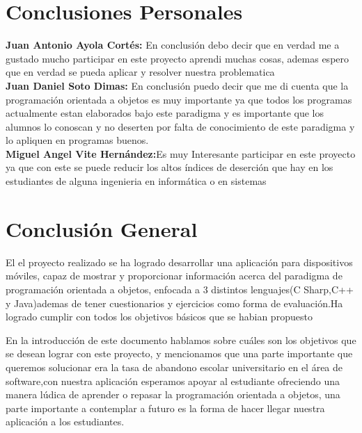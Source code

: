 \section{Conclusiones Personales}
\textbf{Juan Antonio Ayola Cortés: }En conclusión debo decir que en verdad me a gustado mucho participar en este proyecto aprendi muchas cosas, ademas espero que en verdad se pueda aplicar y resolver nuestra problematica\\\newline
\textbf{Juan Daniel Soto Dimas: }En conclusión puedo decir que me di cuenta que la programación orientada a objetos es muy importante ya que todos los programas actualmente estan elaborados bajo este paradigma y es importante que los alumnos lo conoscan y no deserten por falta de conocimiento de este paradigma y lo apliquen en programas buenos.\\\newline
\textbf{Miguel Angel Vite Hernández:}Es muy Interesante participar en este proyecto ya que con este se puede reducir los altos índices de deserción que hay en los estudiantes de alguna ingenieria en informática o en sistemas\\\newline

\section{Conclusión General}
El el proyecto realizado se ha logrado desarrollar una aplicación para dispositivos móviles, capaz de mostrar y proporcionar información acerca del paradigma de programación orientada a objetos, enfocada a 3 distintos lenguajes(C Sharp,C++ y Java)ademas de tener cuestionarios y ejercicios como forma de evaluación.Ha logrado cumplir con todos los objetivos básicos que se habian propuesto \\\newline

En la introducción de este documento hablamos sobre cuáles son los objetivos que se desean lograr con este proyecto, y mencionamos que una parte importante que queremos solucionar era la tasa de abandono escolar universitario en el área de software,con nuestra aplicación esperamos apoyar al estudiante ofreciendo una manera lúdica de aprender o repasar la programación orientada a objetos, una parte importante a contemplar a futuro es la forma de hacer llegar nuestra aplicación a los estudiantes.\\\newline

